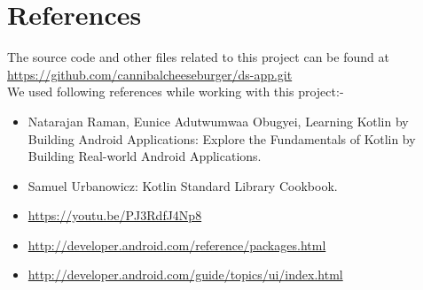\documentclass[11pt,a4paper]{report}
\begin{document}
\chapter{References}
\vskip 1cm
{\large{The source code and other files related to this project can  be found at}\\
\url{https://github.com/cannibalcheeseburger/ds-app.git}\\
\vskip 1cm
\large{We used following references while working with this project:-}
\begin{itemize}
	\item  Natarajan Raman, Eunice Adutwumwaa Obugyei, Learning Kotlin by Building Android Applications: Explore the Fundamentals of Kotlin by Building Real-world Android Applications.
	\item Samuel Urbanowicz: Kotlin Standard Library Cookbook.
	\item \url{https://youtu.be/PJ3RdfJ4Np8}
	\item \url{http://developer.android.com/reference/packages.html}
	\item \url{http://developer.android.com/guide/topics/ui/index.html}
\end{itemize}
}
\end{document}
